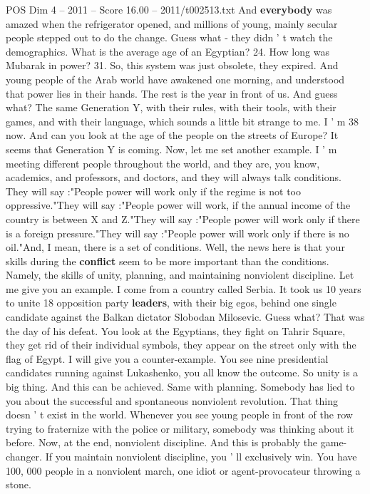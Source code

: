 \begin{textsample}{POS Dim 4 – 2011 – Score 16.00 – 2011/t002513.txt}
And \textbf{everybody} was amazed when the refrigerator opened, and millions of young, mainly secular people stepped out to do the change.
Guess what - they didn ' t watch the demographics.
What is the average age of an Egyptian? 24.
How long was Mubarak in power? 31.
So, this system was just obsolete, they expired.
And young people of the Arab world have awakened one morning, and understood that power lies in their hands.
The rest is the year in front of us.
And guess what?
The same Generation Y, with their rules, with their tools, with their games, and with their language, which sounds a little bit strange to me.
I ' m 38 now.
And can you look at the age of the people on the streets of Europe?
It seems that Generation Y is coming.
Now, let me set another example.
I ' m meeting different people throughout the world, and they are, you know, academics, and professors, and doctors, and they will always talk conditions.
They will say :"People power will work only if the regime is not too oppressive."They will say :"People power will work, if the annual income of the country is between X and Z."They will say :"People power will work only if there is a foreign pressure."They will say :"People power will work only if there is no oil."And, I mean, there is a set of conditions.
Well, the news here is that your skills during the \textbf{conflict} seem to be more important than the conditions.
Namely, the skills of unity, planning, and maintaining nonviolent discipline.
Let me give you an example.
I come from a country called Serbia.
It took us 10 years to unite 18 opposition party \textbf{leaders}, with their big egos, behind one single candidate against the Balkan dictator Slobodan Milosevic.
Guess what?
That was the day of his defeat.
You look at the Egyptians, they fight on Tahrir Square, they get rid of their individual symbols, they appear on the street only with the flag of Egypt.
I will give you a counter-example.
You see nine presidential candidates running against Lukashenko, you all know the outcome.
So unity is a big thing.
And this can be achieved.
Same with planning.
Somebody has lied to you about the successful and spontaneous nonviolent revolution.
That thing doesn ' t exist in the world.
Whenever you see young people in front of the row trying to fraternize with the police or military, somebody was thinking about it before.
Now, at the end, nonviolent discipline.
And this is probably the game-changer.
If you maintain nonviolent discipline, you ' ll exclusively win.
You have 100, 000 people in a nonviolent march, one idiot or agent-provocateur throwing a stone.

\end{textsample}
